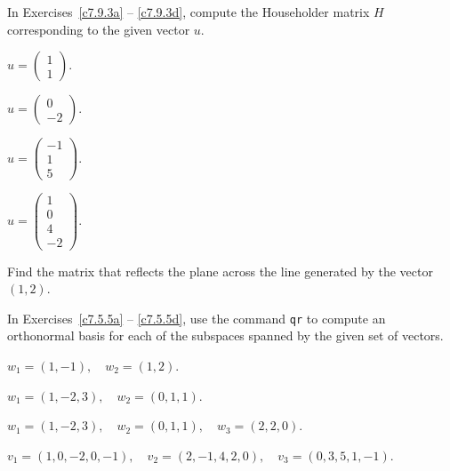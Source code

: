 \documentclass{ximera}
\begin{document}
\noindent In Exercises~\ref{c7.9.3a} -- \ref{c7.9.3d}, compute the
Householder matrix $H$ corresponding to the given vector $u$.
\begin{exercise} \label{c7.9.3a}
$u = \left(\begin{array}{r} 1\\ 1 \end{array}\right)$.
\end{exercise}
\begin{exercise} \label{c7.9.3b}
$u = \left(\begin{array}{r} 0\\ -2 \end{array}\right)$.
\end{exercise}
\begin{exercise} \label{c7.9.3c}
$u = \left(\begin{array}{r} -1\\ 1 \\5\end{array}\right)$.
\end{exercise}
\begin{exercise} \label{c7.9.3d}
$u = \left(\begin{array}{r} 1\\ 0 \\ 4\\ -2\end{array}\right)$.
\end{exercise}

\begin{exercise} \label{c7.9.4}
Find the matrix that reflects the plane across the line generated by the
vector $(1,2)$.
\end{exercise}



\CEXER

In Exercises~\ref{c7.5.5a} -- \ref{c7.5.5d}, use the \Matlab command
{\tt qr} to compute an orthonormal basis for each of the subspaces spanned
by the given set of vectors.
\begin{exercise} \label{c7.5.5a}
$w_1=(1,-1),\quad w_2=(1,2)$.
\end{exercise}
\begin{exercise} \label{c7.5.5b}
$w_1=(1,-2,3),\quad w_2=(0,1,1)$.
\end{exercise}
\begin{exercise} \label{c7.5.5c}
$w_1=(1,-2,3),\quad w_2=(0,1,1),\quad w_3=(2,2,0)$.
\end{exercise}
\begin{exercise} \label{c7.5.5d}
$v_1=(1,0,-2,0,-1),\quad v_2=(2,-1,4,2,0),\quad v_3=(0,3,5,1,-1)$.
\end{exercise}
\end{document}
